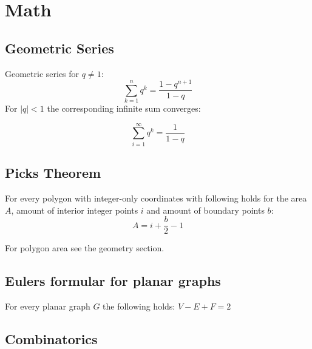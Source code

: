 \section{Math}

\subsection{Geometric Series}
Geometric series for $q \neq 1$:
\[
\sum\limits_{k=1}^n q^k = \frac{1-q^{n+1}}{1-q}
\]
For $\lvert q \rvert < 1$ the corresponding infinite sum converges:

\[
\sum_{i = 1}^{\infty} q^k = \frac{1}{1 - q}
\]

\subsection{Picks Theorem}
For every polygon with integer-only coordinates with following holds
for the area $A$, amount of interior integer points $i$ and amount of
boundary points $b$:
\[
A = i + \frac{b}{2} - 1
\]

For polygon area see the geometry section.

\subsection{Eulers formular for planar graphs}
For every planar graph $G$ the following holds: $V - E + F = 2$

\subsection{Combinatorics}

